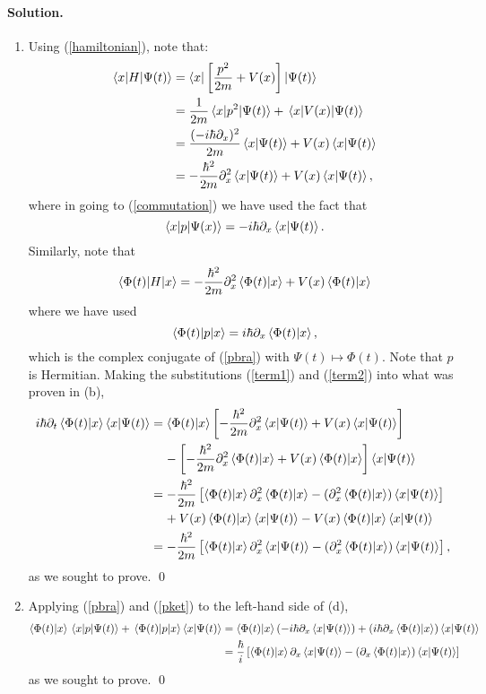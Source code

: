 \documentclass[10pt]{article}
\newcommand{\refeq}[1]{(\ref{#1})}
\newenvironment{solution}
{
    \paragraph{Solution.}
    \ignorespaces
}
{
    \bigskip
}
\begin{document}
\begin{solution}
\begin{enumerate}
		\item Using \refeq{hamiltonian}, note that:
			\begin{align}
				\mel{x}{H}{\Psi(t)} &= \bra{x} \left[ \frac{p^2}{2m} + V(x) \right] \ket{\Psi(t)} \\
				&= \frac{1}{2m} \mel{x}{p^2}{\Psi(t)} + \mel{x}{V(x)}{\Psi(t)} \\
				&= \frac{(-i \hbar \partial_x)^2}{2m} \braket{x}{\Psi(t)} + V(x) \braket{x}{\Psi(t)} \label{commutation} \\
				&= -\frac{\hbar^2}{2m} \partial_x^2 \braket{x}{\Psi(t)} + V(x) \braket{x}{\Psi(t)}, \label{term1}
			\end{align}
			where in going to \refeq{commutation} we have used the fact that
			\begin{equation} \label{pbra}
				\mel{x}{p}{\Psi(x)} = -i \hbar \partial_x \braket{x}{\Psi(t)}.
			\end{equation}
			Similarly, note that
			\begin{equation} \label{term2}
				\mel{\Phi(t)}{H}{x} = -\frac{\hbar^2}{2m} \partial_x^2 \braket{\Phi(t)}{x} + V(x) \braket{\Phi(t)}{x}
			\end{equation}
			where we have used
			\begin{equation} \label{pket}
				 \mel{\Phi(t)}{p}{x} = i \hbar \partial_x \braket{\Phi(t)}{x},
			\end{equation}
			which is the complex conjugate of \refeq{pbra} with $\Psi(t) \mapsto \Phi(t)$.  Note that $p$ is Hermitian.  Making the substitutions \refeq{term1} and \refeq{term2} into what was proven in (b),
			\begin{align}
				i \hbar \partial_t \braket{\Phi(t)}{x} \braket{x}{\Psi(t)} &= \braket{\Phi(t)}{x} \left[ -\frac{\hbar^2}{2m} \partial_x^2 \braket{x}{\Psi(t)} + V(x) \braket{x}{\Psi(t)} \right] \notag \\
    				&\phantom{=\ } - \left[ -\frac{\hbar^2}{2m} \partial_x^2 \braket{\Phi(t)}{x} + V(x) \braket{\Phi(t)}{x} \right] \braket{x}{\Psi(t)} \\
				&= -\frac{\hbar^2}{2m} \left[ \braket{\Phi(t)}{x} \partial_x^2 \braket{\Phi(t)}{x} - (\partial_x^2 \braket{\Phi(t)}{x}) \braket{x}{\Psi(t)} \right] \notag \\
				&\phantom{=\ } + V(x) \braket{\Phi(t)}{x} \braket{x}{\Psi(t)} - V(x) \braket{\Phi(t)}{x} \braket{x}{\Psi(t)} \\
				&= -\dfrac{\hbar^2}{2m} \left[ \braket{\Phi(t)}{x} \partial_x^2 \braket{x}{\Psi(t)} - (\partial_x^2 \braket{\Phi(t)}{x}) \braket{x}{\Psi(t)} \right],
			\end{align}
			as we sought to prove. \qed
			
		\item Applying \refeq{pbra} and \refeq{pket} to the left-hand side of (d),
			\begin{align}
				\braket{\Phi(t)}{x} \mel{x}{p}{\Psi(t)} + \mel{\Phi(t)}{p}{x} \braket{x}{\Psi(t)} &= \braket{\Phi(t)}{x} (-i \hbar \partial_x \braket{x}{\Psi(t)}) + (i \hbar \partial_x \braket{\Phi(t)}{x}) \braket{x}{\Psi(t)} \\
				&= \dfrac{\hbar}{i} \left[ \braket{\Phi(t)}{x} \partial_x \braket{x}{\Psi(t)} - (\partial_x \braket{\Phi(t)}{x}) \braket{x}{\Psi(t)} \right]
			\end{align}
			as we sought to prove. \qed
			

\end{enumerate}
\end{solution}
\end{document}
